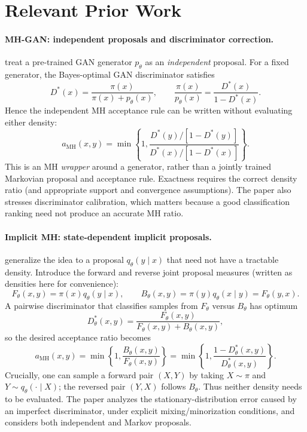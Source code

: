 \documentclass[11pt]{article}
\begin{document}
\section{Relevant Prior Work}
\paragraph{MH-GAN: independent proposals and discriminator correction.}
\cite{turner2019metropolis} treat a pre-trained GAN generator $p_\theta$ as an \emph{independent} proposal. For a fixed generator, the Bayes-optimal GAN discriminator satisfies
\begin{equation}
D^*(x)=\frac{\pi(x)}{\pi(x)+p_\theta(x)},
\qquad
\frac{\pi(x)}{p_\theta(x)}=\frac{D^*(x)}{1-D^*(x)}.
\end{equation}
Hence the independent MH acceptance rule can be written without evaluating either density:
\begin{equation}
a_{\mathrm{MH}}(x,y)
=\min\left\{1,\frac{D^*(y)/[1-D^*(y)]}{D^*(x)/[1-D^*(x)]}\right\}.
\label{eq:mhgan}
\end{equation}
This is an MH \emph{wrapper} around a generator, rather than a jointly trained Markovian proposal and acceptance rule. Exactness requires the correct density ratio (and appropriate support and convergence assumptions). The paper also stresses discriminator calibration, which matters because a good classification ranking need not produce an accurate MH ratio.

\paragraph{Implicit MH: state-dependent implicit proposals.}
\cite{neklyudov2019implicit} generalize the idea to a proposal $q_\theta(y\mid x)$ that need not have a tractable density. Introduce the forward and reverse joint proposal measures (written as densities here for convenience):
\begin{equation}
F_\theta(x,y)=\pi(x)q_\theta(y\mid x),
\qquad
B_\theta(x,y)=\pi(y)q_\theta(x\mid y)=F_\theta(y,x).
\label{eq:flows}
\end{equation}
A pairwise discriminator that classifies samples from $F_\theta$ versus $B_\theta$ has optimum
\begin{equation}
D^*_{\theta}(x,y)=\frac{F_\theta(x,y)}{F_\theta(x,y)+B_\theta(x,y)},
\end{equation}
so the desired acceptance ratio becomes
\begin{equation}
a_{\mathrm{MH}}(x,y)=\min\left\{1,\frac{B_\theta(x,y)}{F_\theta(x,y)}\right\}
=\min\left\{1,\frac{1-D^*_{\theta}(x,y)}{D^*_{\theta}(x,y)}\right\}.
\label{eq:implicit-mh}
\end{equation}
Crucially, one can sample a forward pair $(X,Y)$ by taking $X\sim\pi$ and $Y\sim q_\theta(\cdot\mid X)$; the reversed pair $(Y,X)$ follows $B_\theta$. Thus neither density needs to be evaluated. The paper analyzes the stationary-distribution error caused by an imperfect discriminator, under explicit mixing/minorization conditions, and considers both independent and Markov proposals. 
\end{document}

